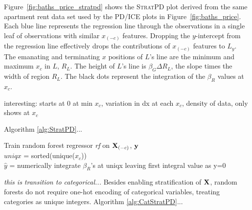 \documentclass[12pt]{article}
\newcommand{\figref}[1]{Figure~\ref{#1}}
\newcommand{\spd}{\fontfamily{cmr}\textsc{\small StratPD}}
\begin{document}
\figref{fig:baths_price_stratpd} shows the \spd{} plot derived from the same apartment rent data set used by the PD/ICE plots in \figref{fig:baths_price}. Each blue line represents the regression line through the observations in a single leaf of observations with similar $x_{(-c)}$ features. Dropping the $y$-intercept from the regression line effectively drops the contributions of $x_{(-c)}$ features to $L_y$.  The emanating and terminating $x$ positions of $L$'s line are the minimum and maximum $x_c$ in $L$, $R_L$. The height of $L$'s line is $\beta_G \Delta{}R_L$, the slope times the width of region $R_L$. The black dots represent the integration of the $\beta_R$ values at $x_c$.

interesting: starts at 0 at min $x_c$, variation in dx at each $x_c$, density of data, only shows at $x_c$

Algorithm \ref{alg:StratPD}...

\setlength{\algomargin}{5pt}
\begin{algorithm}[H]
\label{alg:StratPD}
\LinesNumbered
{}
\SetAlgoSkip{}
\SetInd{.5em}{.5em}
Train random forest regressor {\it rf} on ${\bf X}_{(-c)}$, $\bf y$\\
$uniqx$ = sorted(unique($x_c$))\\
$\hat{y}$ = numerically integrate $\beta_R$'s at uniqx leaving first integral value as y=0\\
\end{algorithm}

{\em this is transition to categorical...} Besides enabling stratification of $\bf X$, random forests do not require one-hot encoding of categorical variables, treating categories as unique integers. Algorithm \ref{alg:CatStratPD}...
\end{document}
